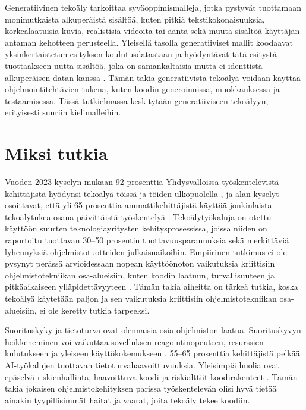 \documentclass[utf8,bachelor]{gradu3}
\begin{document}
Generatiivinen tekoäly tarkoittaa syväoppimismalleja, jotka pystyvät tuottamaan monimutkaista alkuperäistä sisältöä, kuten pitkiä tekstikokonaisuuksia, korkealaatuisia kuvia, realistisia videoita tai ääntä sekä muuta sisältöä käyttäjän antaman kehotteen perusteella. Yleisellä tasolla generatiiviset mallit koodaavat yksinkertaistetun esityksen koulutusdatastaan ja hyödyntävät tätä esitystä tuottaakseen uutta sisältöä, joka on samankaltaisia mutta ei identtistä alkuperäisen datan kanssa \parencite{noauthor_what_2024-1}. Tämän takia generatiivista tekoälyä voidaan käyttää ohjelmointitehtävien tukena, kuten koodin generoinnissa, muokkauksessa ja testaamisessa. Tässä tutkielmassa keskitytään generatiiviseen tekoälyyn, erityisesti suuriin kielimalleihin.

\section{Miksi tutkia}

Vuoden 2023 kyselyn mukaan 92 prosenttia Yhdysvalloissa työskentelevistä kehittäjistä hyödynsi tekoälyä töissä ja töiden ulkopuolella \parencite{staff_survey_2023}, ja alan kyselyt osoittavat, että yli 65 prosenttia ammattikehittäjistä käyttää jonkinlaista tekoälytukea osana päivittäistä työskentelyä \parencite{rahman_international_2024}. Tekoälytyökaluja on otettu käyttöön suurten teknologiayritysten kehitysprosessissa, joissa niiden on raportoitu tuottavan 30–50 prosentin tuottavuusparannuksia sekä merkittäviä lyhennyksiä ohjelmistotuotteiden julkaisuaikoihin. Empiirinen tutkimus ei ole pysynyt perässä arvioidessaan nopean käyttöönoton vaikutuksia kriittisiin ohjelmistotekniikan osa-alueisiin, kuten koodin laatuun, turvallisuuteen ja pitkäaikaiseen ylläpidettävyyteen \parencite{rahman_international_2024}. Tämän takia aiheitta on tärkeä tutkia, koska tekoälyä käytetään paljon ja sen vaikutuksia kriittisiin ohjelmistotekniikan osa-alueisiin, ei ole keretty tutkia tarpeeksi.

Suorituskyky ja tietoturva ovat olennaisia osia ohjelmiston laatua. Suorituskyvyn heikkeneminen voi vaikuttaa sovelluksen reagointinopeuteen, resurssien kulutukseen ja yleiseen käyttökokemukseen \parencite{li_assessing_2024}. 55–65 prosenttia kehittäjistä pelkää AI-työkalujen tuottavan tietoturvahaavoittuvuuksia. Yleisimpiä huolia ovat epäselvä riskienhallinta, haavoittuva koodi ja riskialttiit koodirakenteet \parencite{staff_survey_2023}. Tämän takia jokaisen ohjelmistokehityksen parissa työskentelevän olisi hyvä tietää ainakin tyypillisimmät haitat ja vaarat, joita tekoäly tekee koodiin.
\end{document}
